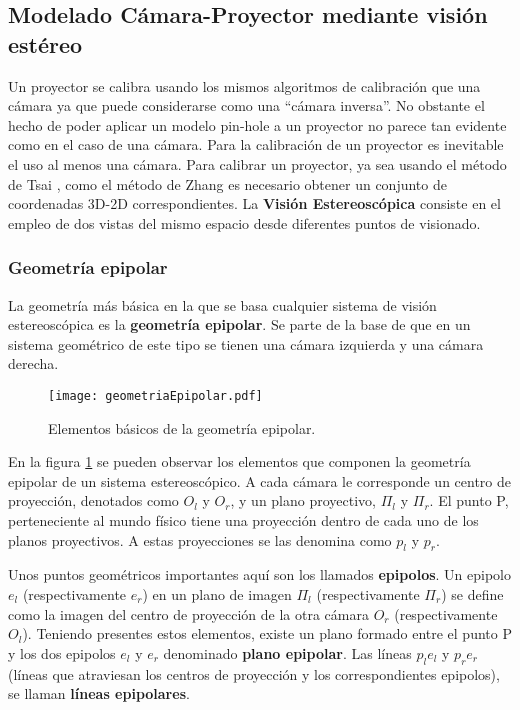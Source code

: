 \subsection{Modelado Cámara-Proyector mediante visión estéreo}

Un proyector se calibra usando los mismos algoritmos de calibración que una cámara ya que puede
considerarse como una ``cámara inversa''. No obstante el hecho de poder aplicar un modelo pin-hole
a un proyector no parece tan evidente como en el caso de una cámara. Para la calibración de un
proyector es inevitable el uso al menos una cámara. Para calibrar un proyector, ya sea usando el
método de Tsai \cite{Tsai}, como el método de Zhang \cite{Zhang99} es necesario obtener un conjunto
de coordenadas 3D-2D correspondientes. La \textbf{Visión Estereoscópica} consiste en el empleo de
dos vistas del mismo espacio desde diferentes puntos de visionado.

\subsubsection{Geometría epipolar}

La geometría más básica en la que se basa cualquier sistema de visión estereoscópica es la \textbf{geometría epipolar}. Se parte de la base de que en un sistema geométrico de este tipo se tienen una cámara izquierda y una cámara derecha.

\begin{figure}[h!]
  \centering
  \texttt{[image: geometriaEpipolar.pdf]}
  \caption{Elementos básicos de la geometría epipolar.}
  \label{fig:FIGgeomEpipolar}
\end{figure}


En la figura \ref{fig:FIGgeomEpipolar} se pueden observar los elementos que componen la geometría
epipolar de un sistema estereoscópico. A cada cámara le corresponde un centro de proyección,
denotados como $O_{l}$ y $O_{r}$, y un plano proyectivo, $\Pi_{l}$ y $\Pi_{r}$. El punto P,
perteneciente al mundo físico tiene una proyección dentro de cada uno de los planos proyectivos. A
estas proyecciones se las denomina como $p_{l}$ y $p_{r}$.


Unos puntos geométricos importantes aquí son los llamados \textbf{epipolos}. Un epipolo $e_l$ (res\-pectivamente $e_r$) en un plano de imagen $\Pi_{l}$ (respectivamente $\Pi_{r}$) se define como la imagen del centro de proyección de la otra cámara $O_{r}$ (respectivamente $O_{l}$). Teniendo presentes estos elementos, existe un plano formado entre el punto P y los dos epipolos $e_{l}$ y $e_{r}$ denominado \textbf{plano epipolar}. Las líneas $p_{l}e_{l}$ y $p_{r}e_{r}$ (líneas que atraviesan los centros de proyección y los correspondientes epipolos), se llaman \textbf{líneas epipolares}.


